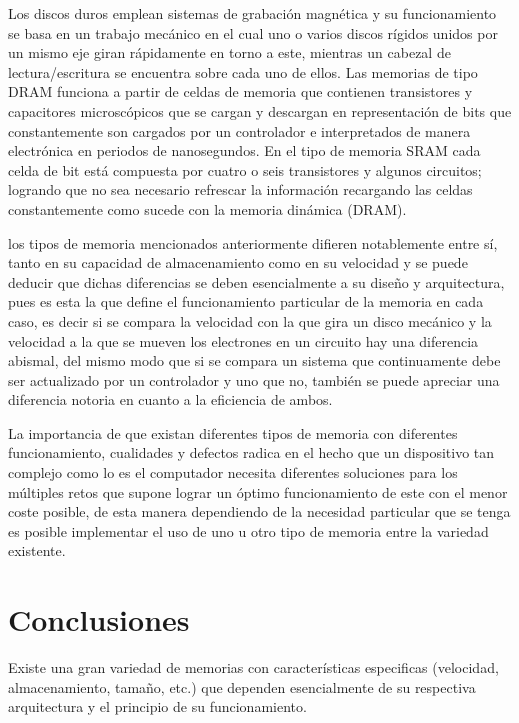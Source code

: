 \documentclass{article}
\begin{document}
Los discos duros emplean sistemas de grabación magnética y su funcionamiento se basa en un trabajo mecánico en el cual uno o varios discos rígidos unidos por un mismo eje giran rápidamente en torno a este, mientras un cabezal de lectura/escritura se encuentra sobre cada uno de ellos.
Las memorias de tipo DRAM funciona a partir de celdas de memoria que contienen transistores y capacitores microscópicos que se cargan y descargan en representación de bits que constantemente son cargados por un controlador e interpretados de manera electrónica en periodos de nanosegundos.
En el tipo de memoria SRAM cada celda de bit está compuesta por cuatro o seis transistores y algunos circuitos; logrando que no sea necesario refrescar la información recargando las celdas constantemente como sucede con la memoria dinámica (DRAM).

los tipos de memoria mencionados anteriormente  difieren notablemente entre sí, tanto en su capacidad de almacenamiento como en su velocidad y se puede deducir que dichas diferencias se deben esencialmente a su diseño y arquitectura, pues es esta la que define el funcionamiento particular de la memoria en cada caso, es decir si se compara la velocidad con la que gira un disco mecánico y la velocidad a la que se mueven los electrones en un circuito hay una diferencia abismal, del mismo modo que si se compara un sistema que continuamente debe ser actualizado por un controlador y uno que no, también se puede apreciar una diferencia notoria en cuanto a la eficiencia de ambos.

\vspace{0.5cm}

La importancia de que existan diferentes tipos de memoria con diferentes funcionamiento, cualidades y defectos radica en el hecho que un dispositivo tan complejo como lo es el computador necesita diferentes soluciones para los múltiples retos que supone lograr un óptimo funcionamiento de este con el menor coste posible, de esta manera dependiendo de la necesidad particular que se tenga es posible implementar el uso de uno u otro tipo de memoria entre la variedad existente.


\section{Conclusiones} \label{contenido}

Existe una gran variedad de memorias con características especificas (velocidad, almacenamiento, tamaño, etc.) que dependen esencialmente de su respectiva arquitectura y el principio de su funcionamiento.
\end{document}
